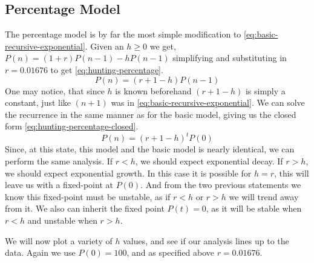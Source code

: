 \documentclass{article}
\begin{document}
\subsection{Percentage Model}
The percentage model is by far the most simple modification to \cref{eq:basic-recursive-exponential}. Given an $h \ge 0$ we get, $P(n) = (1 + r)P(n-1) - hP(n-1)$ simplifying and substituting in $r=0.01676$ to get \cref{eq:hunting-percentage}.
\begin{equation}\label{eq:hunting-percentage}
    P(n) = (r+1-h)P(n-1)
\end{equation}
One may notice, that since $h$ is known beforehand $(r+1-h)$ is simply a constant, just like $(n+1)$ was in \cref{eq:basic-recursive-exponential}. We can solve the recurrence in the same manner as for the basic model, giving us the closed form \cref{eq:hunting-percentage-closed}.
\begin{equation}\label{eq:hunting-percentage-closed}
    P(n) = (r+1-h)^tP(0)
\end{equation}
Since, at this state, this model and the basic model is nearly identical, we can perform the same analysis. If $r < h$, we should expect exponential decay. If $r > h$, we should expect exponential growth. In this case it is possible for $h = r$, this will leave us with a fixed-point at $P(0)$. And from the two previous statements we know this fixed-point must be unstable, as if $r < h$ or $r > h$ we will trend away from it. We also can inherit the fixed point $P(t)=0$, as it will be stable when $r < h$ and unstable when $r > h$.

We will now plot a variety of $h$ values, and see if our analysis lines up to the data. Again we use $P(0)=100$, and as specified above $r = 0.01676$.
\end{document}
